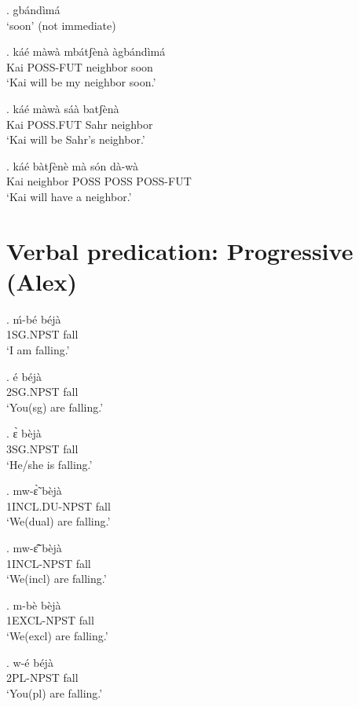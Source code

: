 \documentclass{assets/fieldnotes}
\begin{document}
{\ex. gbándìmá \\
`soon' (not immediate)

\exg. káé màwà mbátʃènà àgbándìmá\\
Kai POSS-FUT neighbor soon \\
`Kai will be my neighbor soon.'


\exg. káé màwà sáà batʃènà \\
Kai POSS.FUT Sahr neighbor \\
`Kai will be Sahr's neighbor.'

\exg. káé bàtʃènè mà són dà-wà \\
Kai neighbor POSS POSS POSS-FUT \\
`Kai will have a neighbor.'


\section{Verbal predication: Progressive (Alex)} %

\exg.
ḿ-bé        béjà \\
1SG.NPST   fall \\%
`I am falling.'

\exg.
é         béjà \\
2SG.NPST   fall \\%
`You(sg) are falling.'

\exg.
ɛ̀         bèjà \\
3SG.NPST   fall \\%
`He/she is falling.'

\exg.
mw-ɛ̃̀    bèjà \\
1INCL.DU-NPST   fall \\%
`We(dual) are falling.'

\exg.
mw-ɛ̃̂         bèjà \\
1INCL-NPST  fall \\%
`We(incl) are falling.'

\exg.
m-bè         bèjà \\
1EXCL-NPST   fall \\%
`We(excl) are falling.' \label{We(excl) are falling}


\exg.
w-é        béjà \\
2PL-NPST   fall \\%
`You(pl) are falling.'

}
\end{document}
